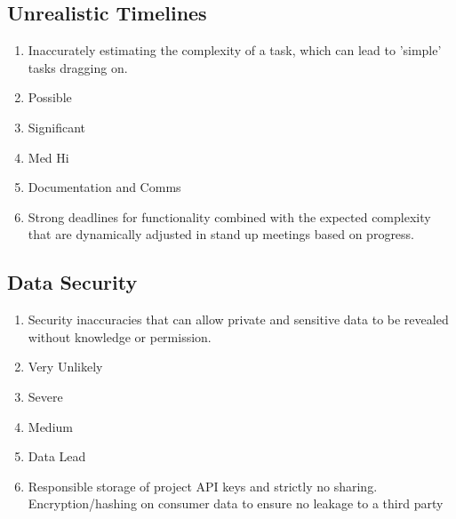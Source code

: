 \documentclass[]{report}
\begin{document}
	\subsection*{Unrealistic Timelines}
	\begin{enumerate}
		\item Inaccurately estimating the complexity of a task, which can lead to 'simple' tasks dragging on.
		\item Possible 
		\item Significant
		\item Med Hi
		\item Documentation and Comms
		\item Strong deadlines for functionality combined with the expected complexity that are dynamically adjusted in stand up meetings based on progress.
	\end{enumerate}
	\subsection*{Data Security}
	\begin{enumerate}
		\item Security inaccuracies that can allow private and sensitive data to be revealed without knowledge or permission.
		\item Very Unlikely
		\item Severe
		\item Medium
		\item Data Lead
		\item Responsible storage of project API keys and strictly no sharing. Encryption/hashing on consumer data to ensure no leakage to a third party
	\end{enumerate}
	
	
\end{document}

